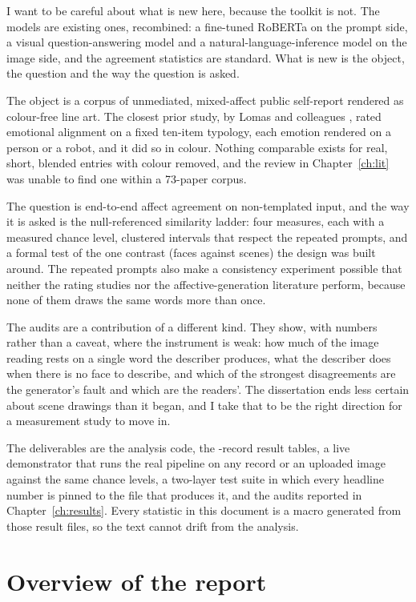 I want to be careful about what is new here, because the toolkit is not. The models are existing ones, recombined: a fine-tuned RoBERTa on the prompt side, a visual question-answering model and a natural-language-inference model on the image side, and the agreement statistics are standard. What is new is the object, the question and the way the question is asked.

The object is a corpus of unmediated, mixed-affect public self-report rendered as colour-free line art. The closest prior study, by Lomas and colleagues \cite{lomas2024improved}, rated emotional alignment on a fixed ten-item typology, each emotion rendered on a person or a robot, and it did so in colour. Nothing comparable exists for real, short, blended entries with colour removed, and the review in Chapter~\ref{ch:lit} was unable to find one within a 73-paper corpus.

The question is end-to-end affect agreement on non-templated input, and the way it is asked is the null-referenced similarity ladder: four measures, each with a measured chance level, clustered intervals that respect the repeated prompts, and a formal test of the one contrast (faces against scenes) the design was built around. The repeated prompts also make a consistency experiment possible that neither the rating studies nor the affective-generation literature perform, because none of them draws the same words more than once.

The audits are a contribution of a different kind. They show, with numbers rather than a caveat, where the instrument is weak: how much of the image reading rests on a single word the describer produces, what the describer does when there is no face to describe, and which of the strongest disagreements are the generator's fault and which are the readers'. The dissertation ends less certain about scene drawings than it began, and I take that to be the right direction for a measurement study to move in.

The deliverables are the analysis code, the \nAnalysed{}-record result tables, a live demonstrator that runs the real pipeline on any record or an uploaded image against the same chance levels, a two-layer test suite in which every headline number is pinned to the file that produces it, and the audits reported in Chapter~\ref{ch:results}. Every statistic in this document is a macro generated from those result files, so the text cannot drift from the analysis.

\section{Overview of the report}
\label{sec:intro-overview}

